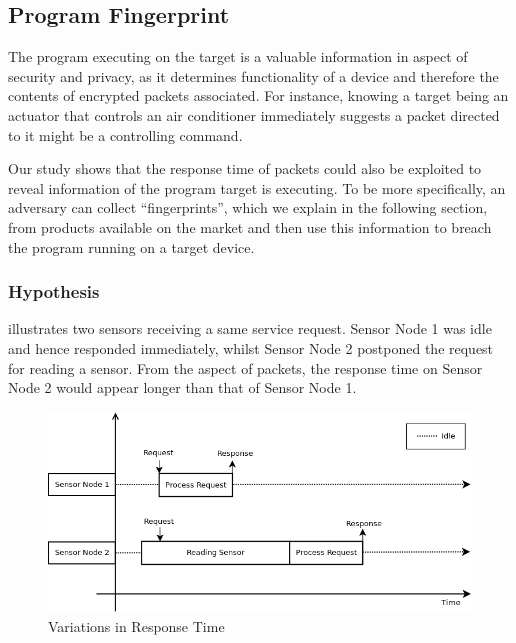 \subsection{Program Fingerprint}
The program executing on the target is a valuable information in aspect of security and privacy, as it determines functionality of a device and therefore the contents of encrypted packets associated. For instance, knowing a target being an actuator that controls an air conditioner immediately suggests a packet directed to it might  be a controlling command.

Our study shows that the response time of packets could also be exploited to reveal information of the program target is executing. To be more specifically, an adversary can collect ``fingerprints'', which we explain in the following section, from products available on the market and then use this information to breach the program running on a target device.

\subsubsection{Hypothesis}
 illustrates two sensors receiving a same service request. Sensor Node 1 was idle and hence responded immediately, whilst Sensor Node 2 postponed the request for reading a sensor. From the aspect of packets, the response time on Sensor Node 2 would appear longer than that of Sensor Node 1.

\begin{figure}
	\center
	\includegraphics[width=\textwidth]{fig/PingProbe_Theory.png}
	\caption{Variations in Response Time\label{FingerprintTheory}}
\end{figure}

